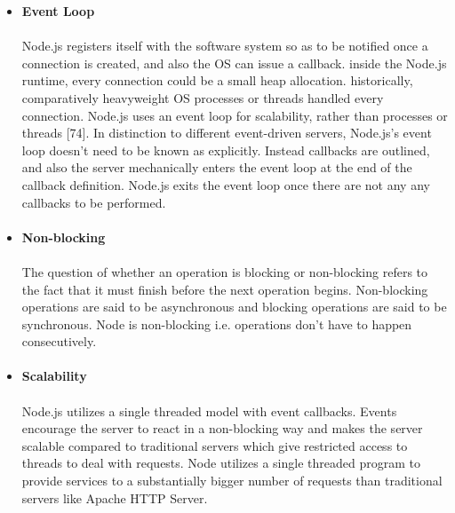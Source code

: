 \documentclass[thesis.tex]{subfiles}
\begin{document}
\begin{itemize}
    \paragraph{}
    \item \textbf{Event Loop}
    \paragraph{}
    Node.js registers itself with the software system so as to be notified once a connection is created, and also the OS can issue a callback. inside the Node.js runtime, every connection could be a small heap allocation. historically, comparatively heavyweight OS processes or threads handled every connection. Node.js uses an event loop for scalability, rather than processes or threads [74]. In distinction to different event-driven servers, Node.js's event loop doesn't need to be known as explicitly. Instead callbacks are outlined, and also the server mechanically enters the event loop at the end of the callback definition. Node.js exits the event loop once there are not any any callbacks to be performed.
    \paragraph{}
    \item \textbf{Non-blocking}
    \paragraph{}
    The question of whether an operation is blocking or non-blocking refers to the fact that it must finish before the next operation begins. Non-blocking operations are said to be asynchronous and blocking operations are said to be synchronous. Node is non-blocking i.e. operations don't have to happen consecutively.
    \paragraph{}
    \item \textbf{Scalability}
    \paragraph{}
    Node.js utilizes a single threaded model with event callbacks. Events encourage the server to react in a non-blocking way and makes the server scalable compared to traditional servers which give restricted access to threads to deal with requests. Node utilizes a single threaded program to provide services to a substantially bigger number of requests than traditional servers like Apache HTTP Server.

\end{itemize}
\end{document}
